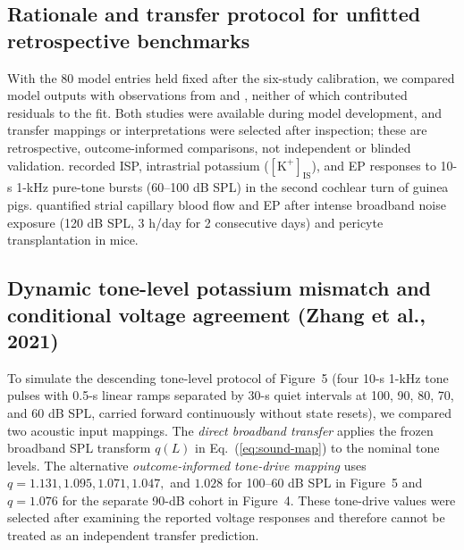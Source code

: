 \documentclass[final,5p,times]{elsarticle}
\begin{document}
\subsection{Rationale and transfer protocol for unfitted retrospective benchmarks}\label{sec:benchmarks-rationale}

With the 80 model entries held fixed after the six-study calibration, we compared model outputs with observations from \citet{Zhang2021} and \citet{Hou2020}, neither of which contributed residuals to the fit. Both studies were available during model development, and transfer mappings or interpretations were selected after inspection; these are retrospective, outcome-informed comparisons, not independent or blinded validation. \citet{Zhang2021} recorded ISP, intrastrial potassium (\([\mathrm{K}^+]_{\mathrm{IS}}\)), and EP responses to 10-s 1-kHz pure-tone bursts (60--100 dB SPL) in the second cochlear turn of guinea pigs. \citet{Hou2020} quantified strial capillary blood flow and EP after intense broadband noise exposure (120 dB SPL, 3 h/day for 2 consecutive days) and pericyte transplantation in mice.

\subsection{Dynamic tone-level potassium mismatch and conditional voltage agreement (Zhang et al., 2021)}\label{sec:benchmarks-zhang}

To simulate the descending tone-level protocol of \citet{Zhang2021} Figure~5 (four 10-s 1-kHz tone pulses with 0.5-s linear ramps separated by 30-s quiet intervals at 100, 90, 80, 70, and 60 dB SPL, carried forward continuously without state resets), we compared two acoustic input mappings. The \emph{direct broadband transfer} applies the frozen broadband SPL transform \(q(L)\) in Eq.~(\ref{eq:sound-map}) to the nominal tone levels. The alternative \emph{outcome-informed tone-drive mapping} uses \(q=1.131, 1.095, 1.071, 1.047,\) and \(1.028\) for 100--60 dB SPL in Figure~5 and \(q=1.076\) for the separate 90-dB cohort in Figure~4. These tone-drive values were selected after examining the reported voltage responses and therefore cannot be treated as an independent transfer prediction.
\end{document}
